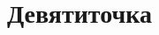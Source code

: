 \documentclass[14pt]{article}
\begin{document}
	\section{Девятиточка}
	\begin{figure}
	\end{figure}
	\begin{figure}
	\end{figure}
	\begin{figure}
	\end{figure}
	\begin{figure}
	\end{figure}
\end{document}

